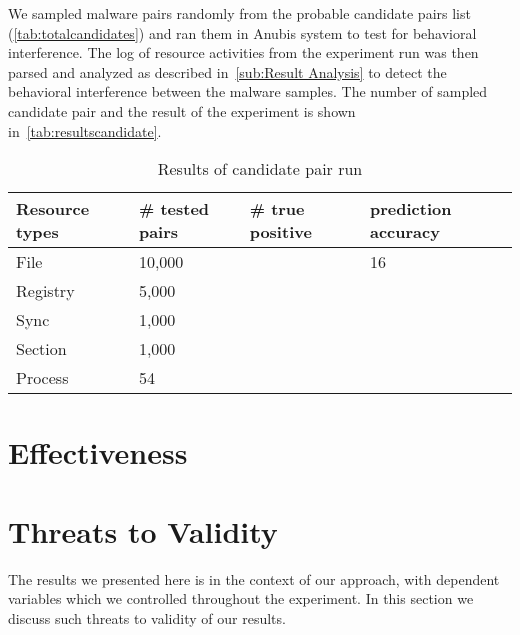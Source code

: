 We sampled malware pairs randomly from the probable candidate pairs list (\autoref{tab:totalcandidates}) and ran them in Anubis system to test for behavioral interference.
The log of resource activities from the experiment run was then parsed and analyzed as described in~\autoref{sub:Result Analysis} to detect the behavioral interference between the malware samples.
The number of sampled candidate pair and the result of the experiment is shown in~\autoref{tab:resultscandidate}.
\begin{table}[ht]
  \caption[Results of candidate pair run]{Results of candidate pair run}\label{tab:resultscandidate}
  \centering
  \begin{tabular}{l l l l}
    \toprule
    Resource types & \# tested pairs & \# true positive & prediction accuracy\\
    \midrule
    File & 10,000 & & 16\\
    Registry & 5,000 & \\
    Sync & 1,000 & & \\
    Section & 1,000 & & \\
    Process & 54 & & \\
    \bottomrule
  \end{tabular}
\end{table}
\section{Effectiveness}
\label{sec:Effectiveness}

\section{Threats to Validity}
\label{sec:Threats to Validity}
The results we presented here is in the context of our approach, with dependent variables which we controlled throughout the experiment.
In this section we discuss such threats to validity of our results.

